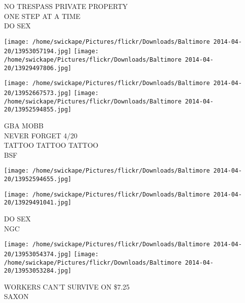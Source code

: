 \documentclass[10pt,letterpaper]{article}
\begin{document}
NO TRESPASS PRIVATE PROPERTY\\
ONE STEP AT A TIME\\
DO SEX\\
\pagebreak

\texttt{[image: /home/swickape/Pictures/flickr/Downloads/Baltimore 2014-04-20/13953057194.jpg]}
\texttt{[image: /home/swickape/Pictures/flickr/Downloads/Baltimore 2014-04-20/13929497806.jpg]}

\texttt{[image: /home/swickape/Pictures/flickr/Downloads/Baltimore 2014-04-20/13952667573.jpg]}
\texttt{[image: /home/swickape/Pictures/flickr/Downloads/Baltimore 2014-04-20/13952594855.jpg]}

GBA MOBB\\
NEVER FORGET 4/20\\
TATTOO TATTOO TATTOO\\
BSF\\
\pagebreak

\texttt{[image: /home/swickape/Pictures/flickr/Downloads/Baltimore 2014-04-20/13952594655.jpg]}

\vspace{0.25in}
\texttt{[image: /home/swickape/Pictures/flickr/Downloads/Baltimore 2014-04-20/13929491041.jpg]}

DO SEX\\
NGC\\
\pagebreak

\texttt{[image: /home/swickape/Pictures/flickr/Downloads/Baltimore 2014-04-20/13953054374.jpg]}
\texttt{[image: /home/swickape/Pictures/flickr/Downloads/Baltimore 2014-04-20/13953053284.jpg]}

WORKERS CAN'T SURVIVE ON \$7.25\\
SAXON\\
\pagebreak
\end{document}
